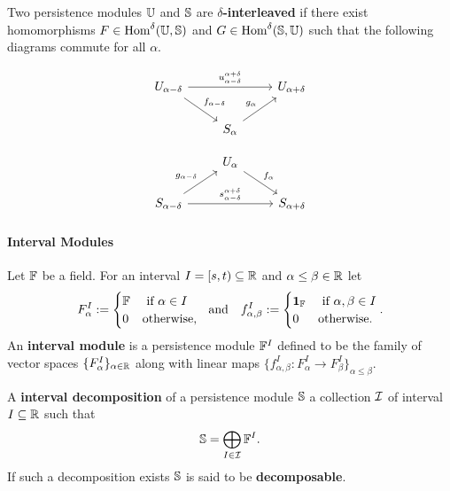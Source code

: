 Two persistence modules $\U$ and $\S$ are \textbf{$\delta$-interleaved} if there exist homomorphisms $F\in\Hom^\delta(\U, \S)$ and $G \in\Hom^\delta(\S,\U)$ such that the following diagrams commute for all $\alpha$.

\begin{minipage}{0.45\textwidth}
\begin{equation}\label{dgm:interleaving1}
  \begin{tikzcd}
    U_{\alpha-\delta}\arrow{rr}{u_{\alpha-\delta}^{\alpha+\delta}}\arrow{dr}{f_{\alpha-\delta}} & &
    U_{\alpha+\delta}\\
    & S_{\alpha}\arrow{ur}{g_\alpha} &
\end{tikzcd}\end{equation}
\end{minipage}
\begin{minipage}{0.45\textwidth}
\begin{equation}\label{dgm:interleaving2}
  \begin{tikzcd}
    & U_{\alpha}\arrow{dr}{f_\alpha} &\\
    S_{\alpha-\delta}\arrow{rr}{s_{\alpha-\delta}^{\alpha+\delta}}\arrow{ur}{g_{\alpha-\delta}} & &
    S_{\alpha+\delta}
\end{tikzcd}\end{equation}
\end{minipage}

\paragraph{Interval Modules}

Let $\FF$ be a field.
For an interval $I = [s,t)\subseteq \R$ and $\alpha\leq\beta\in\R$ let
\[ F_\alpha^I := \begin{cases} \FF&\text{ if } \alpha\in I\\ 0 &\text{otherwise,}\end{cases}\ \text{ and }\ \ f_{\alpha,\beta}^I := \begin{cases} \id_\FF&\text{ if } \alpha,\beta\in I\\ 0&\text{otherwise.}\end{cases}.\]
An \textbf{interval module} is a persistence module $\FF^I$ defined to be the family of vector spaces $\{F_\alpha^I\}_{\alpha\in\R}$ along with linear maps $\{f_{\alpha,\beta}^I : F_\alpha^I\to F_\beta^I\}_{\alpha\leq\beta}$.

A \textbf{interval decomposition} of a persistence module $\S$ a collection $\I$ of interval $I\subseteq\R$ such that
\[ \S = \bigoplus_{I\in \I} \FF^I. \]
If such a decomposition exists $\S$ is said to be \textbf{decomposable}.
